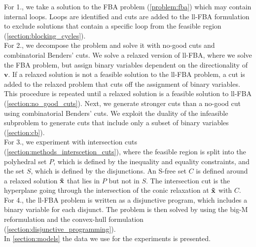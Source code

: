 For 1., we take a solution to the \textsf{FBA} problem (\cref{problem:fba}) which may contain internal loops. Loops are identified and cuts are added to the \textsf{ll-FBA} formulation to exclude solutions that contain a specific loop from the feasible region (\cref{section:blocking_cycles}). \\
For 2., we decompose the problem and solve it with no-good cuts and combinatorial Benders' cuts.
We solve a relaxed version of \textsf{ll-FBA}, where we solve the \textsf{FBA} problem, but assign binary variables dependent on the directionality of $\mathbf v$. If a relaxed solution is not a feasible solution to the \textsf{ll-FBA} problem, a cut is added to the relaxed problem that cuts off the assignment of binary variables. This procedure is repeated until a relaxed solution is a feasible solution to \textsf{ll-FBA} (\cref{section:no_good_cuts}). \newpage
Next, we generate stronger cuts than a no-good cut using combinatorial Benders' cuts. We exploit the duality of the infeasible subproblem to generate cuts that include only a subset of binary variables (\cref{section:cb}). \\
For 3., we experiment with intersection cuts (\cref{section:methods_interscetion_cuts}), where the feasible region is split into the polyhedral set $P$, which is defined by the inequality and equality constraints, and the set $S$, which is defined by the disjunctions. An S-free set $C$ is defined around a relaxed solution $\bold{\tilde x}$ that lies in $P$ but not in $S$. The intersection cut is the hyperplane going through the intersection of the conic relaxation at $\bold{\tilde x}$ with $C$. \\
For 4., the \textsf{ll-FBA} problem is written as a disjunctive program, which includes a binary variable for each disjunct. The problem is then solved by using the big-M reformulation and the convex-hull formulation (\cref{section:disjunctive_programming}). \\
In \cref{section:models} the data we use for the experiments is presented.

